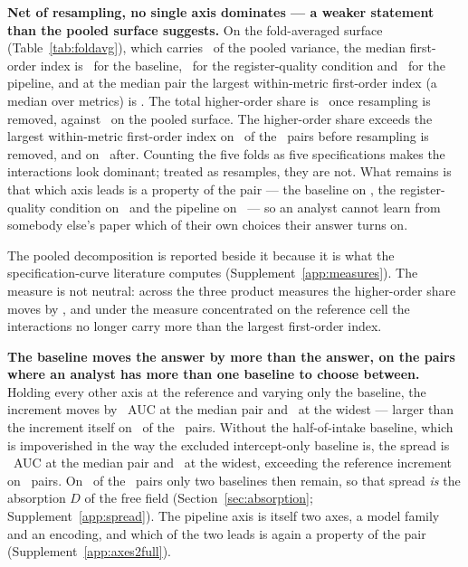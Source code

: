 \documentclass[11pt,3p,review,authoryear]{elsarticle}
\theoremstyle{definition}
\begin{document}
\textbf{Net of resampling, no single axis dominates --- a weaker statement
than the pooled surface suggests.} On the fold-averaged surface
(Table~\ref{tab:foldavg}), which carries \foldVarRatioPct\ of the pooled
variance, the median first-order index is \foldSRungPct\ for the baseline,
\foldSQualityPct\ for the register-quality condition and \foldSPipelinePct\
for the pipeline, and at the median pair the largest within-metric
first-order index (a median over metrics) is \foldLargestFirstOrderPct. The total higher-order share
is \foldInteractionTotalPct\ once resampling is removed, against
\pooledInteractionMedianPct\ on the pooled surface. The higher-order share
exceeds the largest within-metric first-order index on
\nPooledInteractionExceeds\ of the \nPairs\ pairs before resampling is
removed, and on \nFoldInteractionExceeds\ after. Counting the five
folds as five specifications makes the interactions look dominant; treated as
resamples, they are not. What remains is that which axis leads is
a property of the pair --- the baseline on \nFoldLeadPairsRung, the
register-quality condition on \nFoldLeadPairsQuality\ and the pipeline on
\nFoldLeadPairsPipeline\ --- so an analyst cannot learn from somebody else's
paper which of their own choices their answer turns on.

The pooled decomposition is reported beside it because it is what the
specification-curve literature computes (Supplement~\ref{app:measures}). The
measure is not neutral: across the three product measures the higher-order
share moves by \measureSpreadPts, and under the measure concentrated on the
reference cell the interactions no longer carry more than the largest
first-order index.

\textbf{The baseline moves the answer by more than the answer, on the pairs
where an analyst has more than one baseline to choose between.} Holding every
other axis at the reference and varying only the baseline, the increment
moves by \spreadMedian\ AUC at the median pair and \spreadMax\ at the widest
--- larger than the increment itself on \nSpreadExceedsIncrement\ of the
\nPairs\ pairs. Without the half-of-intake baseline, which is impoverished in
the way the excluded intercept-only baseline is, the spread is
\spreadRealisticMedian\ AUC at the median pair and \spreadRealisticMax\ at
the widest, exceeding the reference increment on \nSpreadExceedsRealistic\
pairs. On \nPairsTwoRealisticRungs\ of the \nPairs\ pairs only two baselines
then remain, so that spread \emph{is} the absorption $D$ of the free field
(Section~\ref{sec:absorption}; Supplement~\ref{app:spread}). The pipeline
axis is itself two axes, a model family and an encoding, and which of the two
leads is again a property of the pair (Supplement~\ref{app:axes2full}).
\end{document}
